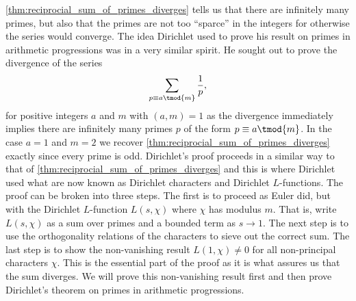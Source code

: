       \cref{thm:reciprocial_sum_of_primes_diverges} tells us that there are infinitely many primes, but also that the primes are not too ``sparce'' in the integers for otherwise the series would converge. The idea Dirichlet used to prove his result on primes in arithmetic progressions was in a very similar spirit. He sought out to prove the divergence of the series
      \[
        \sum_{p \equiv a \tmod{m}}\frac{1}{p},
      \]
      for positive integers $a$ and $m$ with $(a,m) = 1$ as the divergence immediately implies there are infinitely many primes $p$ of the form $p \equiv a \tmod{m}$. In the case $a = 1$ and $m = 2$ we recover \cref{thm:reciprocial_sum_of_primes_diverges} exactly since every prime is odd. Dirichlet's proof proceeds in a similar way to that of \cref{thm:reciprocial_sum_of_primes_diverges} and this is where Dirichlet used what are now known as Dirichlet characters and Dirichlet $L$-functions. The proof can be broken into three steps. The first is to proceed as Euler did, but with the Dirichlet $L$-function $L(s,\chi)$ where $\chi$ has modulus $m$. That is, write $L(s,\chi)$ as a sum over primes and a bounded term as $s \to 1$. The next step is to use the orthogonality relations of the characters to sieve out the correct sum. The last step is to show the non-vanishing result $L(1,\chi) \neq 0$ for all non-principal characters $\chi$. This is the essential part of the proof as it is what assures us that the sum diverges. We will prove this non-vanishing result first and then prove Dirichlet's theorem on primes in arithmetic progressions.

